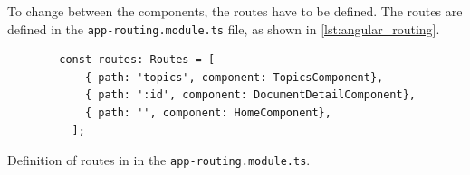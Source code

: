 To change between the components, the routes have to be defined.
The routes are defined in the \texttt{app-routing.module.ts} file, as shown in \autoref{lst:angular_routing}.

\begin{listing}[htp]
    \begin{verbatim}
        const routes: Routes = [
            { path: 'topics', component: TopicsComponent},
            { path: ':id', component: DocumentDetailComponent},
            { path: '', component: HomeComponent},
          ];
    \end{verbatim}
    \caption{Definition of routes in \angular{} in the \texttt{app-routing.module.ts}.
    }
    \label{lst:angular_routing}
\end{listing}